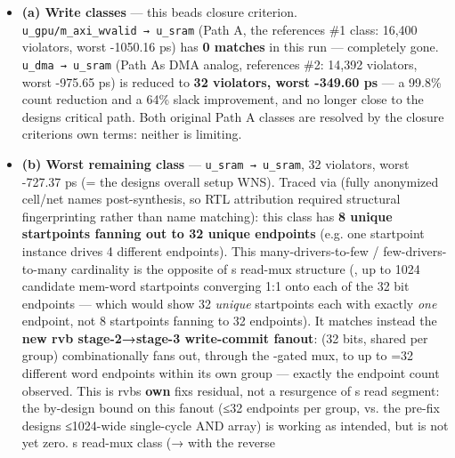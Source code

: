 \begin{record}
\begin{itemize}
\tightlist
\item
  \textbf{(a) Write classes} --- this bead\textquotesingle s closure
  criterion.
  \texttt{u\_\allowbreak{}gpu/\allowbreak{}m\_\allowbreak{}axi\_\allowbreak{}wvalid\ →\ u\_\allowbreak{}sram}
  (Path A, the reference\textquotesingle s \#1 class: 16,400 violators,
  worst -1050.16 ps) has \textbf{0 matches} in this run --- completely
  gone. \texttt{u\_\allowbreak{}dma\ →\ u\_\allowbreak{}sram} (Path
  A\textquotesingle s DMA analog, reference\textquotesingle s \#2:
  14,392 violators, worst -975.65 ps) is reduced to \textbf{32
  violators, worst -349.60 ps} --- a 99.8\% count reduction and a 64\%
  slack improvement, and no longer close to the design\textquotesingle s
  critical path. Both original Path A classes are resolved by the
  closure criterion\textquotesingle s own terms: neither is limiting.
\item
  \textbf{(b) Worst remaining class} ---
  \texttt{u\_\allowbreak{}sram\ →\ u\_\allowbreak{}sram}, 32 violators,
  worst -727.37 ps (= the design\textquotesingle s overall setup WNS).
  Traced via  (fully anonymized cell/net
  names post-synthesis, so RTL attribution required structural
  fingerprinting rather than name matching): this class has \textbf{8
  unique startpoints fanning out to 32 unique endpoints} (e.g. one
  startpoint instance drives 4 different endpoints). This
  many-drivers-to-few / few-drivers- to-many cardinality is the opposite
  of \textquotesingle s read-mux structure (,
  up to 1024 candidate mem-word startpoints converging 1:1 onto each of
  the 32  bit endpoints --- which would show 32
  \emph{unique} startpoints each with exactly \emph{one} endpoint, not 8
  startpoints fanning to 32 endpoints). It matches instead the
  \textbf{new rvb stage-2→stage-3 write-commit fanout}:
   (32 bits, shared per group) combinationally
  fans out, through the -gated mux, to up to
  =32 different  word endpoints within its
  own group --- exactly the endpoint count observed. This is
  rvb\textquotesingle s \textbf{own} fix\textquotesingle s residual, not
  a resurgence of \textquotesingle s read segment: the
  by-design bound on this fanout (≤32 endpoints per group, vs. the
  pre-fix design\textquotesingle s ≤1024-wide single-cycle AND array) is
  working as intended, but is not yet zero. \textquotesingle s
  read-mux class (→ with the reverse

\end{itemize}
\end{record}
